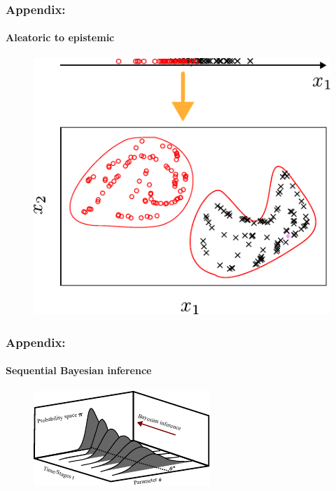 \begin{frame}
\frametitle{Appendix:}
\framesubtitle{Aleatoric to epistemic}
\begin{figure}[!ht]       \includegraphics[scale=1]{figures/figure-transform.pdf}
\end{figure}
    
\end{frame}
\begin{frame}
\frametitle{Appendix:}
\framesubtitle{Sequential Bayesian inference}
\begin{figure}[!ht]       \includegraphics[scale=2.55]{figures/figure-SBI.pdf}
\end{figure}
    
\end{frame}



